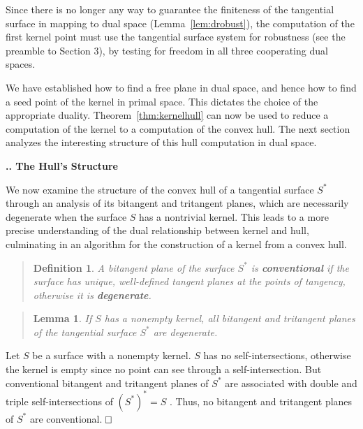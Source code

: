 \documentclass[twoside]{article}
\newtheorem{definitionenv}{Definition}
\newenvironment{defn2}{\begin{quote}\begin{definitionenv}}%
                           {\end{definitionenv}\end{quote}}
\newtheorem{lemmaenv}{Lemma}
\newenvironment{lemma}{\begin{quote}\begin{lemmaenv}}%
                           {\end{lemmaenv}\end{quote}}
\newcommand{\prf}{\noindent{{\bf Proof}:\ \ \ }}
\newcounter{sectionc}\newcounter{subsectionc}\newcounter{subsubsectionc}
\renewcommand{\subsection}[1] {\vspace{12pt}\addtocounter{subsectionc}{1} 
	\setcounter{subsubsectionc}{0}\noindent 
	{\bf\thesectionc.\thesubsectionc. {\kern1pt \bfit #1}}\par\vspace{5pt}}
\def\qed{\hbox{${\vcenter{\vbox{			%
   \hrule height 0.4pt\hbox{\vrule width 0.4pt height 6pt
   \kern5pt\vrule width 0.4pt}\hrule height 0.4pt}}}$}}
\begin{document}
Since there is no longer any way to guarantee the finiteness of the tangential surface
in mapping to dual space (Lemma~\ref{lem:drobust}),
the computation of the first kernel point must use the tangential surface system 
for robustness (see the preamble to Section 3),
by testing for freedom in all three cooperating dual spaces.

We have established how to find a free plane in dual space,
and hence how to find a seed point of the kernel in primal space.
This dictates the choice of the appropriate duality.
Theorem~\ref{thm:kernelhull} can now be used to reduce a computation
of the kernel to a computation of the convex hull.
The next section analyzes the interesting structure of this hull computation in dual space.


\subsection{The Hull's Structure}
\label{sec:cusp}
\noindent
We now examine the structure of the convex hull of a tangential
surface $S^*$ through an analysis of its bitangent and tritangent planes,
which are necessarily degenerate when the surface $S$ has a nontrivial kernel.
This leads to a more precise understanding of the 
dual relationship between kernel and hull, culminating in an
algorithm for the construction of a kernel from a convex hull.

\begin{defn2}
A bitangent plane of the surface $S^*$
is {\bf conventional} if the surface has unique, well-defined 
tangent planes at the points of tangency,
otherwise it is {\bf degenerate}.
\end{defn2}

\begin{lemma}
If $S$ has a nonempty kernel, all bitangent and tritangent planes 
of the tangential surface $S^*$ are degenerate.
\end{lemma}
\prf
Let $S$ be a surface with a nonempty kernel.
$S$ has no self-intersections, otherwise the kernel is empty
since no point can see through a self-intersection.
But conventional bitangent and tritangent planes of $S^*$ are associated
with double and triple self-intersections of $(S^*)^* = S$ \cite{8}.
Thus, no bitangent and tritangent planes of $S^*$ are conventional.
\qed\,

\smallskip
\end{document}
